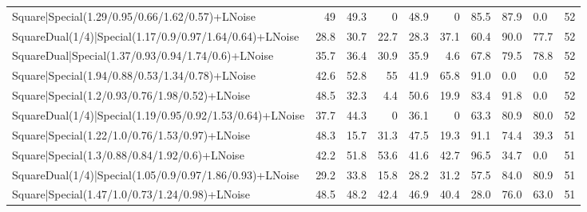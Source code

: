 \begin{tabular}{lrrrrrlllr}
 Square|Special(1.29/0.95/0.66/1.62/0.57)+LNoise                 &            49   &            49.3 &             0   &            48.9 &            0   & 85.5            & 87.9           & 0.0            &           52 \\
 SquareDual(1/4)|Special(1.17/0.9/0.97/1.64/0.64)+LNoise         &            28.8 &            30.7 &            22.7 &            28.3 &           37.1 & 60.4            & 90.0           & 77.7           &           52 \\
 SquareDual|Special(1.37/0.93/0.94/1.74/0.6)+LNoise              &            35.7 &            36.4 &            30.9 &            35.9 &            4.6 & 67.8            & 79.5           & 78.8           &           52 \\
 Square|Special(1.94/0.88/0.53/1.34/0.78)+LNoise                 &            42.6 &            52.8 &            55   &            41.9 &           65.8 & 91.0            & 0.0            & 0.0            &           52 \\
 Square|Special(1.2/0.93/0.76/1.98/0.52)+LNoise                  &            48.5 &            32.3 &             4.4 &            50.6 &           19.9 & 83.4            & 91.8           & 0.0            &           52 \\
 SquareDual(1/4)|Special(1.19/0.95/0.92/1.53/0.64)+LNoise        &            37.7 &            44.3 &             0   &            36.1 &            0   & 63.3            & 80.9           & 80.0           &           52 \\
 Square|Special(1.22/1.0/0.76/1.53/0.97)+LNoise                  &            48.3 &            15.7 &            31.3 &            47.5 &           19.3 & 91.1            & 74.4           & 39.3           &           51 \\
 Square|Special(1.3/0.88/0.84/1.92/0.6)+LNoise                   &            42.2 &            51.8 &            53.6 &            41.6 &           42.7 & 96.5            & 34.7           & 0.0            &           51 \\
 SquareDual(1/4)|Special(1.05/0.9/0.97/1.86/0.93)+LNoise         &            29.2 &            33.8 &            15.8 &            28.2 &           31.2 & 57.5            & 84.0           & 80.9           &           51 \\
 Square|Special(1.47/1.0/0.73/1.24/0.98)+LNoise                  &            48.5 &            48.2 &            42.4 &            46.9 &           40.4 & 28.0            & 76.0           & 63.0           &           51 \\

\end{tabular}

